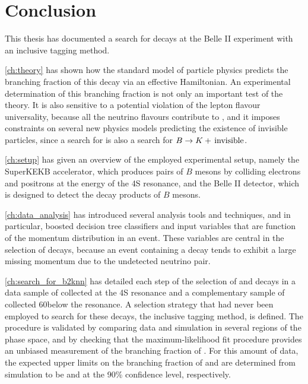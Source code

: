 \chapter{Conclusion} \label{ch:conclusion}
This thesis has documented a search for \BKnn decays at the Belle II experiment with an inclusive tagging method.

\cref{ch:theory} has shown how the standard model of particle physics predicts the branching fraction of this decay via an effective Hamiltonian.
An experimental determination of this branching fraction is not only an important test of the theory.
It is also sensitive to a potential violation of the lepton flavour universality, because all the neutrino flavours contribute to \BKnn, and it imposes constraints on several new physics models predicting the existence of invisible particles, since a search for \BKnn is also a search for $B\rightarrow K+\,\mathrm{invisible}$.

\cref{ch:setup} has given an overview of the employed experimental setup, namely the SuperKEKB accelerator, which produces pairs of $B$ mesons by colliding electrons and positrons at the energy of the \Y4S resonance, and the Belle II detector, which is designed to detect the decay products of $B$ mesons.

\cref{ch:data_analysis} has introduced several analysis tools and techniques, and in particular, boosted decision tree classifiers and input variables that are function of the momentum distribution in an event.
These variables are central in the selection of \BKnn decays, because an event containing a \BKnn decay tends to exhibit a large missing momentum due to the undetected neutrino pair.

\cref{ch:search_for_b2knn} has detailed each step of the selection of \BKpnn and \BKznn decays in a data sample of \lumion collected at the \Y4S resonance and a complementary sample of \lumioff collected 60\mev below the resonance.
A selection strategy that had never been employed to search for these decays, the inclusive tagging method, is defined.
The procedure is validated by comparing data and simulation in several regions of the phase space, and by checking that the maximum-likelihood fit procedure provides an unbiased measurement of the branching fraction of \BKnn.
For this amount of data, the expected upper limits on the branching fraction of \BKpnn and \BKznn are determined from simulation to be \limitKp and \limitKz at the 90\% confidence level, respectively.


